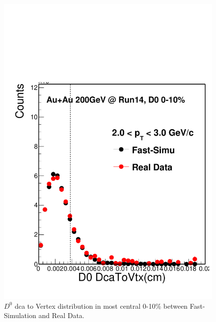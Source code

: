 \begin{figure}[htbp]
\begin{minipage}[htbp]{0.52\linewidth}
\includegraphics[width=1.0\textwidth,angle=0]{figure/Run14_D0HFT/D0Dca2Vtx.pdf} 
\caption{ $D^0$ dca to Vertex distribution in most central 0-10\% between Fast-Simulation and Real Data.\label{D0Dca2Vtx}}
\end{minipage}
\end{figure}

